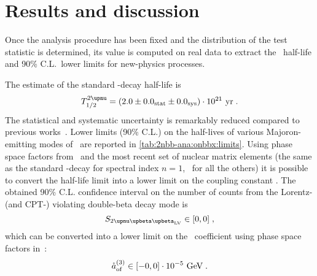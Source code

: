 \begin{table}
  \centering
  \caption{%
    Summary of the systematic uncertainties affecting the \nnbb\ distribution analysis.
  }\label{tab:2nbb-ana:systematics}
  
\end{table}

\section{Results and discussion}%
\label{sec:2nbb-ana:results}

Once the analysis procedure has been fixed and the distribution of the test statistic is
determined, its value is computed on real data to extract the \nnbb\ half-life and 90\%
C.L.~lower limits for new-physics processes.

The estimate of the standard \nnbb-decay half-life is
\[
  \thalftwoM = (2.0 \pm \stat{0.0} \pm \syst{0.0}) \cdot 10^{21}~\text{yr} \;.
\]
The statistical and systematic uncertainty is remarkably reduced compared to previous
works~\cite{Agostini2015a}.
\newpar
Lower limits (90\% C.L.) on the half-lives of various Majoron-emitting modes of \onbb\ are
reported in \cref{tab:2nbb-ana:onbbx:limits}. Using phase space factors
from~\cite{Kotila2015} and the most recent set of nuclear matrix elements (the same as the
standard \onbb-decay for spectral index $n=1$,~\cite{Hirsch1995} for all the others) it is
possible to convert the half-life limit into a lower limit on the coupling constant \ga.
\newpar
The obtained 90\% C.L. confidence interval on the number of counts from the Lorentz- (and
CPT-) violating double-beta decay mode is
\[
  S_\nnbblvM \in [0,0] \;,
\]
which can be converted into a lower limit on the \aof\ coefficient using phase space
factors in~\cite{Nitescu2020}:
\[
  {\mathring{a}_\text{of}^{(3)}} \in [-0, 0] \cdot 10^{-5}~\text{GeV} \;.
\]


\begin{table}
  \centering
  \caption{%
    90\% C.L.~lower limits for new physics processes contributing to the \nnbb\ event
    distribution. Nuclear matrix elements for $n=1$ are the same as the standard \onbb,
    and have been therefore selected from the most recent nuclear calculations. Matrix
    elements for the other decay modes have been taken from~\cite{Hirsch1995}. Phase space
    factors have been taken from~\cite{Kotila2015}. 
  }\label{tab:2nbb-ana:onbbx:limits}
  
\end{table}

